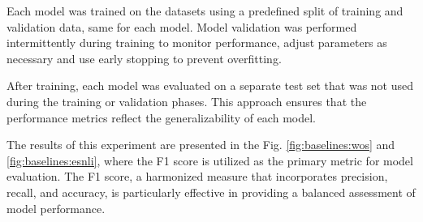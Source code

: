 \begin{table}[h]
    \centering
    \caption{Number of samples in each dataset portion}
    \label{tab:dataset_portions}
\end{table}

Each model was trained on the datasets using a predefined split of training and validation data, same for each model. Model validation was performed intermittently during training to monitor performance, adjust parameters as necessary and use early stopping to prevent overfitting.

After training, each model was evaluated on a separate test set that was not used during the training or validation phases. This approach ensures that the performance metrics reflect the generalizability of each model.

The results of this experiment are presented in the Fig. \ref{fig:baselines:wos} and \ref{fig:baselines:esnli}, where the F1 score is utilized as the primary metric for model evaluation. The F1 score, a harmonized measure that incorporates precision, recall, and accuracy, is particularly effective in providing a balanced assessment of model performance.

